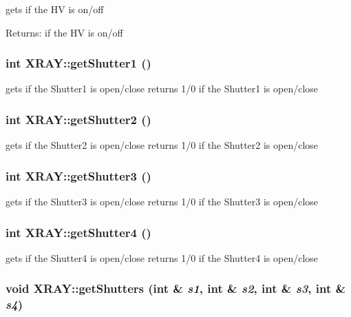 gets if the HV is on/off \begin{Desc}
\item[Returns:]if the HV is on/off \end{Desc}
\subsubsection{\setlength{\rightskip}{0pt plus 5cm}int XRAY::get\-Shutter1 ()}\label{classXRAY_67e0f5fb2aa3ed305d21e3e298e28c87}


gets if the Shutter1 is open/close returns 1/0 if the Shutter1 is open/close 
\subsubsection{\setlength{\rightskip}{0pt plus 5cm}int XRAY::get\-Shutter2 ()}\label{classXRAY_efcb7909f26b1aab7da7df7c108696fa}


gets if the Shutter2 is open/close returns 1/0 if the Shutter2 is open/close 
\subsubsection{\setlength{\rightskip}{0pt plus 5cm}int XRAY::get\-Shutter3 ()}\label{classXRAY_25fea23c2516eabe37365e0ba17e8aa7}


gets if the Shutter3 is open/close returns 1/0 if the Shutter3 is open/close 
\subsubsection{\setlength{\rightskip}{0pt plus 5cm}int XRAY::get\-Shutter4 ()}\label{classXRAY_643be4ceb5bbc33da4ff777c85d2aa4e}


gets if the Shutter4 is open/close returns 1/0 if the Shutter4 is open/close 
\subsubsection{\setlength{\rightskip}{0pt plus 5cm}void XRAY::get\-Shutters (int \& {\em s1}, int \& {\em s2}, int \& {\em s3}, int \& {\em s4})}\label{classXRAY_84375a8f264c79972d2fc5a7f74e2008}


